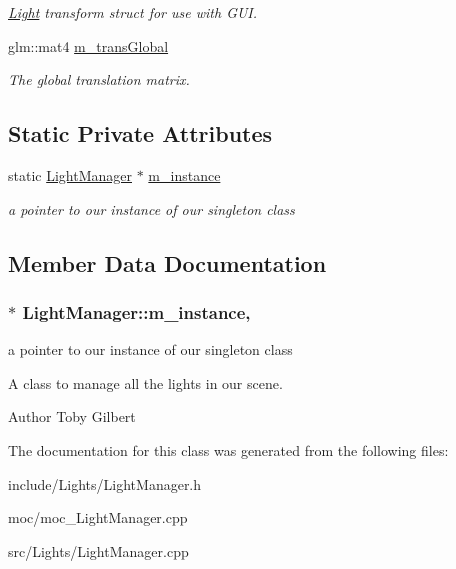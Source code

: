 \begin{DoxyCompactItemize}
\begin{DoxyCompactList}\small\item\em \hyperlink{class_light}{Light} transform struct for use with G\-U\-I. \end{DoxyCompactList}\item 
\hypertarget{class_light_manager_af38a6efb2392351eb6d18de638d389ed}{glm\-::mat4 \hyperlink{class_light_manager_af38a6efb2392351eb6d18de638d389ed}{m\-\_\-trans\-Global}}\label{class_light_manager_af38a6efb2392351eb6d18de638d389ed}

\begin{DoxyCompactList}\small\item\em The global translation matrix. \end{DoxyCompactList}\end{DoxyCompactItemize}
\subsection*{Static Private Attributes}
\begin{DoxyCompactItemize}
\item 
static \hyperlink{class_light_manager}{Light\-Manager} $\ast$ \hyperlink{class_light_manager_af439e6d09dac9e10130945129e8211cc}{m\-\_\-instance}
\begin{DoxyCompactList}\small\item\em a pointer to our instance of our singleton class \end{DoxyCompactList}\end{DoxyCompactItemize}


\subsection{Member Data Documentation}
\hypertarget{class_light_manager_af439e6d09dac9e10130945129e8211cc}{
\subsubsection[{m\-\_\-instance}]{ $\ast$ Light\-Manager\-::m\-\_\-instance\hspace{0.3cm}{\ttfamily [static]}, {\ttfamily [private]}}}\label{class_light_manager_af439e6d09dac9e10130945129e8211cc}


a pointer to our instance of our singleton class 

A class to manage all the lights in our scene.

\begin{DoxyAuthor}{Author}
Toby Gilbert 
\end{DoxyAuthor}


The documentation for this class was generated from the following files\-:\begin{DoxyCompactItemize}
\item 
include/\-Lights/Light\-Manager.\-h\item 
moc/moc\-\_\-\-Light\-Manager.\-cpp\item 
src/\-Lights/Light\-Manager.\-cpp\end{DoxyCompactItemize}
